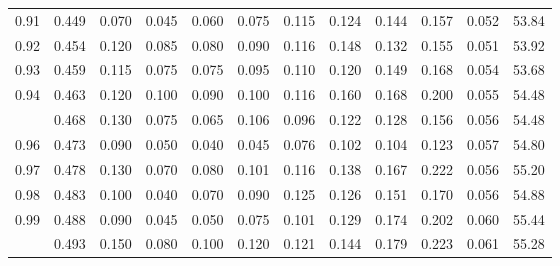 \documentclass[
]{article}
\begin{document}
\begin{table}
{\begin{tabular}[t]{rrrrrrrrrrrr}
0.91 & 0.449 & 0.070 & 0.045 & 0.060 & 0.075 & 0.115 & 0.124 & 0.144 & 0.157 & 0.052 & 53.84\\
0.92 & 0.454 & 0.120 & 0.085 & 0.080 & 0.090 & 0.116 & 0.148 & 0.132 & 0.155 & 0.051 & 53.92\\
0.93 & 0.459 & 0.115 & 0.075 & 0.075 & 0.095 & 0.110 & 0.120 & 0.149 & 0.168 & 0.054 & 53.68\\
0.94 & 0.463 & 0.120 & 0.100 & 0.090 & 0.100 & 0.116 & 0.160 & 0.168 & 0.200 & 0.055 & 54.48\\
\addlinespace
0.95 & 0.468 & 0.130 & 0.075 & 0.065 & 0.106 & 0.096 & 0.122 & 0.128 & 0.156 & 0.056 & 54.48\\
0.96 & 0.473 & 0.090 & 0.050 & 0.040 & 0.045 & 0.076 & 0.102 & 0.104 & 0.123 & 0.057 & 54.80\\
0.97 & 0.478 & 0.130 & 0.070 & 0.080 & 0.101 & 0.116 & 0.138 & 0.167 & 0.222 & 0.056 & 55.20\\
0.98 & 0.483 & 0.100 & 0.040 & 0.070 & 0.090 & 0.125 & 0.126 & 0.151 & 0.170 & 0.056 & 54.88\\
0.99 & 0.488 & 0.090 & 0.045 & 0.050 & 0.075 & 0.101 & 0.129 & 0.174 & 0.202 & 0.060 & 55.44\\
\addlinespace
1.00 & 0.493 & 0.150 & 0.080 & 0.100 & 0.120 & 0.121 & 0.144 & 0.179 & 0.223 & 0.061 & 55.28\\
\bottomrule
\end{tabular}

}

\end{table}%
\end{document}
